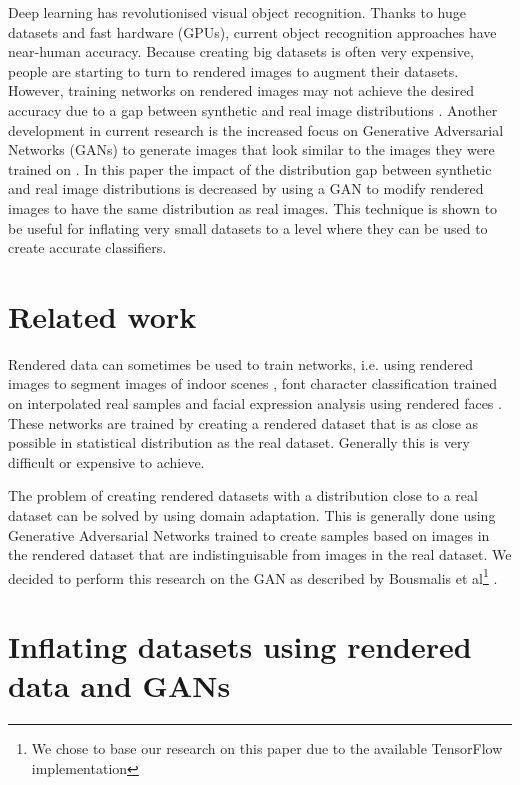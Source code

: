 \documentclass[10pt,twocolumn,letterpaper]{article}
\begin{document}
Deep learning has revolutionised visual object recognition. Thanks to huge datasets and fast hardware (GPUs), current object recognition approaches have near-human accuracy.
Because creating big datasets is often very expensive, people are starting to turn to rendered images to augment their datasets. However, training networks on rendered images may not achieve the desired accuracy due to a gap between synthetic and real image distributions \cite{10.1.1.151.7688}.
Another development in current research is the increased focus on Generative Adversarial Networks (GANs) to generate images that look similar to the images they were trained on \cite{1406.2661}.
In this paper the impact of the distribution gap between synthetic and real image distributions is decreased by using a GAN to modify rendered images to have the same distribution as real images. This technique is shown to be useful for inflating very small datasets to a level where they can be used to create accurate classifiers.

\section{Related work}
Rendered data can sometimes be used to train networks, i.e. using rendered images to segment images of indoor scenes \cite{10.1.1.94.777}, font character classification trained on interpolated real samples \cite{10.1.1.151.7688} and facial expression analysis using rendered faces \cite{Abbasnejad_2017_ICCV}. These networks are trained by creating a rendered dataset that is as close as possible in statistical distribution as the real dataset. Generally this is very difficult or expensive to achieve.

The problem of creating rendered datasets with a distribution close to a real dataset can be solved by using domain adaptation. This is generally done using Generative Adversarial Networks \cite{1703.05192.pdf, 10.1109/CVPR.2017.18, 10.1007/978-3-319-58347-1} trained to create samples based on images in the rendered dataset that are indistinguisable from images in the real dataset. We decided to perform this research on the GAN as described by Bousmalis et al\footnote{We chose to base our research on this paper due to the available TensorFlow\cite{tensorflow} implementation} \cite{10.1109/CVPR.2017.18}.


\section{Inflating datasets using rendered data and GANs}
\end{document}
